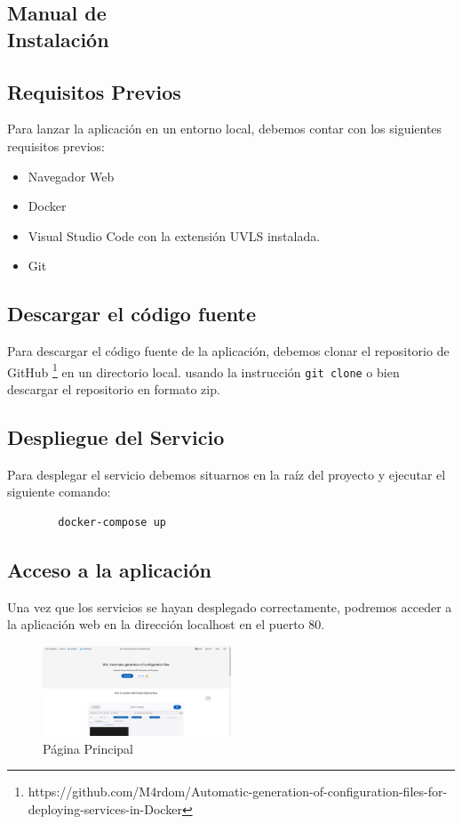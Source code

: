 \documentclass[12pt, a4paper, twoside]{article}
\begin{document}
\begin{umaappendices}
    \section{Manual de \\ Instalación}
	\label{sec:Manual de Instalación}
	\subsection{Requisitos Previos}
	Para lanzar la aplicación en un entorno local, debemos contar con los siguientes requisitos previos:
	\begin{itemize}
		\item Navegador Web
		\item Docker
		\item Visual Studio Code con la extensión UVLS \cite{uvls_code} instalada.
		\item Git
	\end{itemize}

	\subsection{Descargar el código fuente}
	Para descargar el código fuente de la aplicación, debemos clonar el repositorio de GitHub \cite{m4rdom_project_repository}\footnote{https://github.com/M4rdom/Automatic-generation-of-configuration-files-for-deploying-services-in-Docker} en un directorio local.
	usando la instrucción \texttt{git clone} o bien descargar el repositorio en formato zip.
	\subsection{Despliegue del Servicio}
	Para desplegar el servicio debemos situarnos en la raíz del proyecto y ejecutar el siguiente comando:
	\begin{verbatim}
		docker-compose up
	\end{verbatim}
	\subsection{Acceso a la aplicación}
	Una vez que los servicios se hayan desplegado correctamente, podremos acceder a la aplicación web en la dirección localhost en el puerto 80.
	\begin{figure}[ht]
		\centering
			\includegraphics[width=0.5\textwidth]{frontpage.png}
		\caption{Página Principal}
	\end{figure}

\end{umaappendices}
\end{document}
